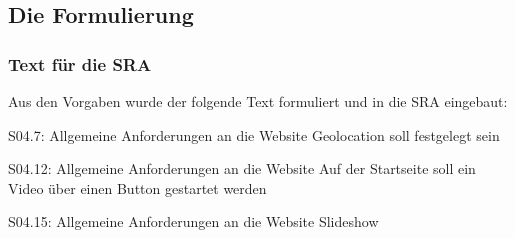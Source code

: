 \subsection{Die Formulierung}
\begin{frame} %
  \frametitle{Text für die SRA} %

  Aus den Vorgaben wurde der folgende Text formuliert und in die SRA eingebaut:
  \begin{block}{S04.7: Allgemeine Anforderungen an die Website}
	  Geolocation soll festgelegt sein
  \end{block}
  
  \begin{block}{S04.12: Allgemeine Anforderungen an die Website}
	  Auf der Startseite soll ein Video über einen Button gestartet werden
  \end{block}

  \begin{block}{S04.15: Allgemeine Anforderungen an die Website}
	  Slideshow
  \end{block}
  	

\end{frame}
